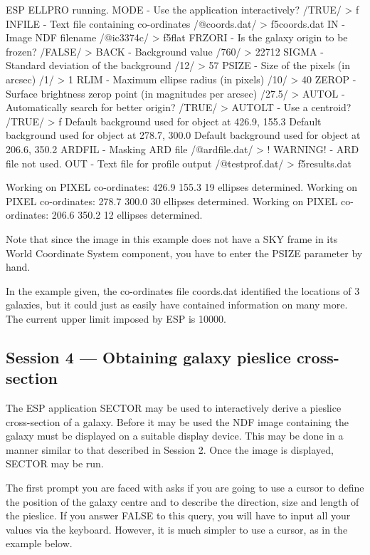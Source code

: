 \documentclass[twoside,11pt]{starlink}
\begin{document}
\begin{small}
\begin{terminalv}

ESP ELLPRO running.
MODE - Use the application interactively? /TRUE/ > f
INFILE - Text file containing co-ordinates /@coords.dat/ > f5coords.dat
IN - Image NDF filename /@ic3374c/ > f5flat
FRZORI - Is the galaxy origin to be frozen? /FALSE/ >
BACK - Background value /760/ > 22712
SIGMA - Standard deviation of the background /12/ > 57
PSIZE - Size of the pixels (in arcsec) /1/ > 1
RLIM - Maximum ellipse radius (in pixels) /10/ > 40
ZEROP - Surface brightness zerop point (in magnitudes per arcsec) /27.5/ >
AUTOL - Automatically search for better origin? /TRUE/ >
AUTOLT - Use a centroid? /TRUE/ > f
Default background used for object at  426.9,  155.3
Default background used for object at  278.7,  300.0
Default background used for object at  206.6,  350.2
ARDFIL - Masking ARD file /@ardfile.dat/ > !
WARNING! - ARD file not used.
OUT - Text file for profile output /@testprof.dat/ > f5results.dat

Working on PIXEL co-ordinates: 426.9  155.3
  19 ellipses determined.
Working on PIXEL co-ordinates: 278.7  300.0
  30 ellipses determined.
Working on PIXEL co-ordinates: 206.6  350.2
  12 ellipses determined.
\end{terminalv}
\end{small}

Note that since the image in this example does not have a SKY
frame in its World Coordinate System component,
you have to enter the PSIZE parameter by hand.

In the example given, the co-ordinates file coords.dat identified the
locations of 3 galaxies, but it could just as
easily have contained information on many more. The current
upper limit imposed by ESP is 10000.


\subsection{Session 4 --- Obtaining galaxy pieslice cross-section}

The ESP application SECTOR may be used to interactively derive a
pieslice cross-section of a galaxy. Before it may be used the
NDF image containing the galaxy must be displayed on a suitable
display device. This may be done in a manner similar to
that described in Session 2. Once the image is displayed, SECTOR
may be run.

The first prompt you are faced with asks if you are going to use a cursor
to define the position of the galaxy centre and to describe the
direction, size and length of the pieslice. If you answer FALSE to this query,
you will have to input all your values via the keyboard. However, it is much
simpler to use a cursor, as in the example below.
\end{document}
